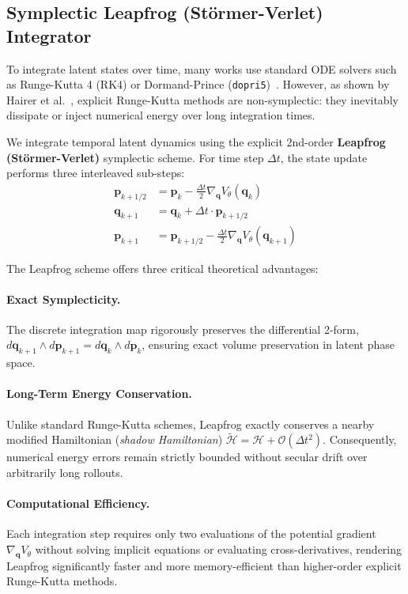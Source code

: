 \documentclass[11pt]{article}
\begin{document}
\subsection{Symplectic Leapfrog (Störmer-Verlet) Integrator}
\label{subsec:leapfrog}

To integrate latent states over time, many works use standard ODE solvers such as Runge-Kutta 4 (RK4) or Dormand-Prince (\texttt{dopri5})~\cite{chen2018neural}. However, as shown by Hairer et al.~\cite{hairer2006geometric}, explicit Runge-Kutta methods are non-symplectic: they inevitably dissipate or inject numerical energy over long integration times.

We integrate temporal latent dynamics using the explicit 2nd-order \textbf{Leapfrog (Störmer-Verlet)} symplectic scheme. For time step $\Delta t$, the state update performs three interleaved sub-steps:
\begin{align}
    \mathbf{p}_{k+1/2} &= \mathbf{p}_k - \frac{\Delta t}{2} \nabla_\mathbf{q} V_\theta(\mathbf{q}_k) \label{eq:leapfrog_1} \\
    \mathbf{q}_{k+1} &= \mathbf{q}_k + \Delta t \cdot \mathbf{p}_{k+1/2} \label{eq:leapfrog_2} \\
    \mathbf{p}_{k+1} &= \mathbf{p}_{k+1/2} - \frac{\Delta t}{2} \nabla_\mathbf{q} V_\theta(\mathbf{q}_{k+1}) \label{eq:leapfrog_3}
\end{align}

The Leapfrog scheme offers three critical theoretical advantages:

\paragraph{Exact Symplecticity.} The discrete integration map rigorously preserves the differential 2-form, $d\mathbf{q}_{k+1} \wedge d\mathbf{p}_{k+1} = d\mathbf{q}_k \wedge d\mathbf{p}_k$, ensuring exact volume preservation in latent phase space.

\paragraph{Long-Term Energy Conservation.} Unlike standard Runge-Kutta schemes, Leapfrog exactly conserves a nearby modified Hamiltonian (\textit{shadow Hamiltonian}) $\widetilde{\mathcal{H}} = \mathcal{H} + \mathcal{O}(\Delta t^2)$. Consequently, numerical energy errors remain strictly bounded without secular drift over arbitrarily long rollouts.

\paragraph{Computational Efficiency.} Each integration step requires only two evaluations of the potential gradient $\nabla_\mathbf{q} V_\theta$ without solving implicit equations or evaluating cross-derivatives, rendering Leapfrog significantly faster and more memory-efficient than higher-order explicit Runge-Kutta methods.
\end{document}
